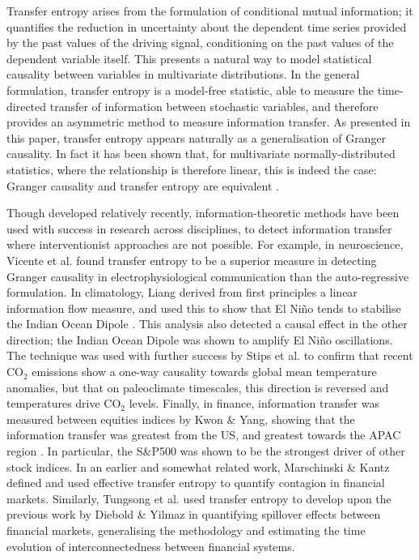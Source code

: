 \documentclass[]{rsos}%
\begin{document}
  Transfer entropy arises from the formulation of conditional mutual information; it quantifies the reduction in uncertainty about the dependent time series provided by the past values of the driving signal, conditioning on the past values of the dependent variable itself. This presents a natural way to model statistical causality between variables in multivariate distributions. In the general formulation, transfer entropy is a model-free statistic, able to measure the time-directed transfer of information between stochastic variables, and therefore provides an asymmetric method to measure information transfer. As presented in this paper, transfer entropy appears naturally as a generalisation of Granger causality. In fact it has been shown that, for multivariate normally-distributed statistics, where the relationship is therefore linear, this is indeed the case: Granger causality and transfer entropy are equivalent \cite{barnett2009granger}.

  Though developed relatively recently, information-theoretic methods have been used with success in research across disciplines, to detect information transfer where interventionist approaches are not possible. For example, in neuroscience, Vicente et al. \cite{vicente2011transfer} found transfer entropy to be a superior measure in detecting Granger causality in electrophysiological communication than the auto-regressive formulation. In climatology, Liang derived from first principles a linear information flow measure, and used this to show that El Ni\~{n}o tends to stabilise the Indian Ocean Dipole \cite{san2014unraveling}. This analysis also detected a causal effect in the other direction; the Indian Ocean Dipole was shown to amplify El Ni\~{n}o oscillations. The technique was used with further success by Stips et al. \cite{stips2016causal} to confirm that recent CO$_2$ emissions show a one-way causality towards global mean temperature anomalies, but that on paleoclimate timescales, this direction is reversed and temperatures drive CO$_2$ levels. Finally, in finance, information transfer was measured between equities indices by Kwon \& Yang, showing that the information transfer was greatest from the US, and greatest towards the APAC region \cite{kwon2008information}. In particular, the S\&P500 was shown to be the strongest driver of other stock indices. In an earlier and somewhat related work, Marschinski \& Kantz   \cite{Marschinski2002} defined and used effective transfer entropy to quantify contagion in financial markets. Similarly, Tungsong et al. \cite{tungsong2018} used transfer entropy to develop upon the previous work by Diebold \& Yilmaz \cite{diebold2009measuring} in quantifying spillover effects between financial markets, generalising the methodology and estimating the time evolution of interconnectedness between financial systems.
\end{document}
